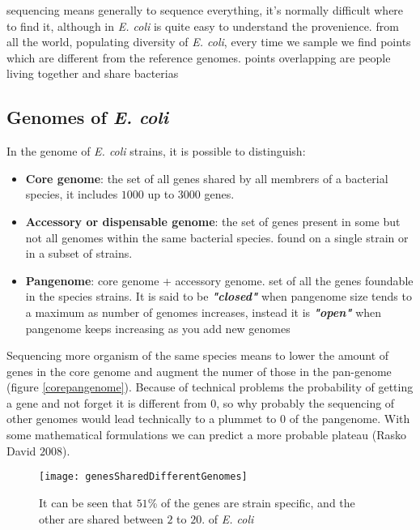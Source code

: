 sequencing means generally to sequence everything, it's normally difficult where to find it, although in \emph{\emph{E. coli}} is quite easy to understand the provenience.
from all the world, populating diversity of \emph{\emph{E. coli}}, every time we sample we find points which are different from the reference genomes.
points overlapping are people living together and share bacterias


\subsection{Genomes of \emph{E. coli}}

In the genome of \emph{E. coli} strains, it is possible to distinguish:

\begin{itemize}
    \item \textbf{Core genome}: the set of all genes shared by all membrers of a bacterial species, it includes $1000$ up to $3000$ genes.
    \item \textbf{Accessory or dispensable genome}: the set of genes present in some but not all genomes within the same bacterial species. found on a single strain or in a subset of strains.
    \item \textbf{Pangenome}: core genome + accessory genome. set of all the genes foundable in the species strains. It is said to be \textit{\textbf{"closed"}} when pangenome size tends to a maximum as number of genomes increases, instead it is \textit{\textbf{"open"}} when pangenome keeps increasing as you add new genomes
\end{itemize}


Sequencing more organism of the same species means to lower the amount of genes in the core genome and augment the numer of those in the pan-genome (figure \ref{corepangenome}).
Because of technical problems the probability of getting a gene and not forget it is different from $0$, so why probably the sequencing of other genomes would lead technically to a plummet to $0$ of the pangenome. With some mathematical formulations we can predict a more probable plateau (Rasko David $2008$).

\begin{figure}[h]
\caption{It can be seen that $51$\% of the genes are strain specific, and the other are shared between $2$ to $20$.  of \emph{E. coli}}
\centering
\texttt{[image: genesSharedDifferentGenomes]}
\end{figure}

